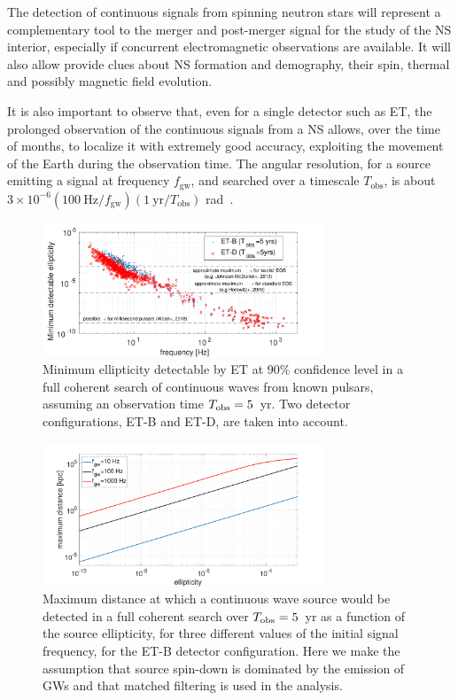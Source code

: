 The detection of continuous signals from spinning neutron stars will represent a complementary tool to the merger and post-merger signal for the study of the NS interior, especially if concurrent electromagnetic observations are available. It will also allow provide clues about NS formation and demography, their spin, thermal and possibly magnetic field evolution.  

It is also important to observe that, even for a single detector such as ET, the prolonged observation of the continuous signals from a NS allows, over the time of months, to localize it with extremely good accuracy, exploiting the movement of the Earth during the observation time. The angular resolution, for a source emitting a signal at frequency $f_\text{gw}$, and searched over a timescale $T_\text{obs}$, is about $3\times 10^{-6}\left(100~\text{Hz}/f_\text{gw}\right)\left(1~\text{yr}/T_\text{obs}\right)$ rad~\cite{Astone:2014esa}.

\begin{figure}[t]
\centering
\includegraphics[width=0.75\textwidth]{Figures/ET_eps-eps-converted-to.pdf}
\caption{Minimum ellipticity detectable by ET at 90$\%$ confidence level in a full coherent search of continuous waves from known pulsars, assuming an observation time $T_{\rm obs}=5$~yr. Two detector configurations, ET-B and ET-D, are taken into account. 
}
\label{fig:eps_vs_dist}
\end{figure} 

\begin{figure}[t]
\centering
\includegraphics[width=0.75\textwidth]{Figures/ETB_maxdistance-eps-converted-to.pdf}
\caption{Maximum distance at which a continuous wave source would be detected in a full coherent search over $T_{\rm obs}=5$~yr as a function of the source ellipticity, for three different values of the initial signal frequency, for the ET-B detector configuration. Here we make the assumption that source spin-down is dominated by the emission of GWs and that matched filtering is used in the analysis.
}
\label{fig:et_eps}
\end{figure} 

